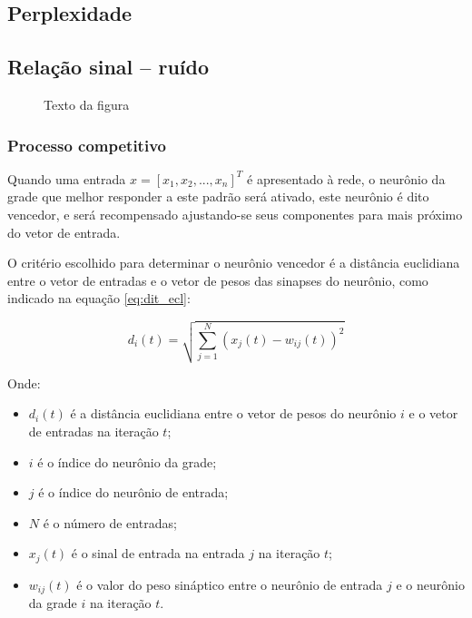 \subsection{Perplexidade} 

\subsection{Relação sinal – ruído}

\begin{figure}[H]
\centering

\caption{Texto da figura}
\end{figure}


\subsubsection{Processo competitivo}

Quando uma entrada $ x = \left[x_1, x_2, ..., x_n\right]^T $ é apresentado à
rede, o neurônio da grade que melhor responder a este padrão será ativado, este
neurônio é dito vencedor, e será recompensado ajustando-se seus componentes
para mais próximo do vetor de entrada.

O critério escolhido para determinar o neurônio vencedor é a distância
euclidiana entre o vetor de entradas e o vetor de pesos das sinapses do
neurônio, como indicado na equação \ref{eq:dit_ecl}:

\begin{equation}\label{eq:dit_ecl}
d_i(t) = \sqrt{\sum_{j = 1}^N \left( x_j(t) - w_{ij}(t) \right)^2}
\end{equation}

Onde:

\begin{itemize}
\item $ d_i(t) $ é a distância euclidiana entre o vetor de pesos do
neurônio $ i $ e o vetor de entradas na iteração $ t $;
\item $ i $ é o índice do neurônio da grade;
\item $ j $ é o índice do neurônio de entrada;
\item $ N $ é o número de entradas;
\item $ x_j(t) $ é o sinal de entrada na entrada $ j $ na iteração $ t $;
\item $ w_{ij}(t) $ é o valor do peso sináptico entre o neurônio de
entrada $ j $ e o neurônio da grade $ i $ na iteração $ t $.
\end{itemize}

